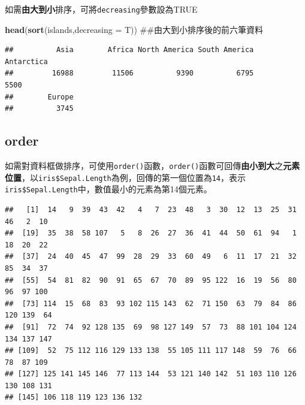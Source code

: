 \documentclass[]{book}
\newenvironment{Shaded}{\begin{snugshade}}{\end{snugshade}}
\newcommand{\KeywordTok}[1]{\textcolor[rgb]{0.13,0.29,0.53}{\textbf{{#1}}}}
\newcommand{\DataTypeTok}[1]{\textcolor[rgb]{0.13,0.29,0.53}{{#1}}}
\newcommand{\DecValTok}[1]{\textcolor[rgb]{0.00,0.00,0.81}{{#1}}}
\newcommand{\NormalTok}[1]{{#1}}
\theoremstyle{definition}
\theoremstyle{definition}
\theoremstyle{remark}
\begin{document}
如需\textbf{由大到小}排序，可將\texttt{decreasing}參數設為TRUE

\begin{Shaded}
\begin{Highlighting}[]
\KeywordTok{head}\NormalTok{(}\KeywordTok{sort}\NormalTok{(islands,}\DataTypeTok{decreasing =} \NormalTok{T)) ##由大到小排序後的前六筆資料}
\end{Highlighting}
\end{Shaded}

\begin{verbatim}
##          Asia        Africa North America South America    Antarctica 
##         16988         11506          9390          6795          5500 
##        Europe 
##          3745
\end{verbatim}

\subsection{order}\label{order}

如需對資料框做排序，可使用\texttt{order()}函數，\texttt{order()}函數可回傳\textbf{由小到大}之\textbf{元素位置}，以\texttt{iris\$Sepal.Length}為例，回傳的第一個位置為\texttt{14}，表示\texttt{iris\$Sepal.Length}中，數值最小的元素為第14個元素。

\begin{Shaded}
\end{Shaded}

\begin{verbatim}
##   [1]  14   9  39  43  42   4   7  23  48   3  30  12  13  25  31  46   2  10
##  [19]  35  38  58 107   5   8  26  27  36  41  44  50  61  94   1  18  20  22
##  [37]  24  40  45  47  99  28  29  33  60  49   6  11  17  21  32  85  34  37
##  [55]  54  81  82  90  91  65  67  70  89  95 122  16  19  56  80  96  97 100
##  [73] 114  15  68  83  93 102 115 143  62  71 150  63  79  84  86 120 139  64
##  [91]  72  74  92 128 135  69  98 127 149  57  73  88 101 104 124 134 137 147
## [109]  52  75 112 116 129 133 138  55 105 111 117 148  59  76  66  78  87 109
## [127] 125 141 145 146  77 113 144  53 121 140 142  51 103 110 126 130 108 131
## [145] 106 118 119 123 136 132
\end{verbatim}

\begin{Shaded}
\end{Shaded}
\end{document}

